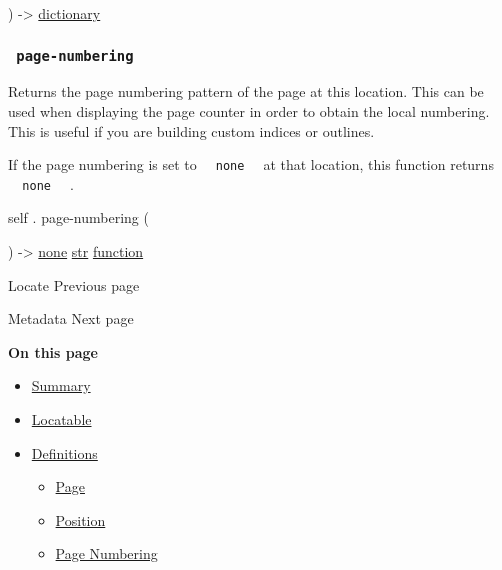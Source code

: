 ) -\textgreater{}
\href{/docs/reference/foundations/dictionary/}{dictionary}

\subsubsection{\texorpdfstring{\texttt{\ page-numbering\ }}{ page-numbering }}\label{definitions-page-numbering}

Returns the page numbering pattern of the page at this location. This
can be used when displaying the page counter in order to obtain the
local numbering. This is useful if you are building custom indices or
outlines.

If the page numbering is set to
\texttt{\ }{\texttt{\ none\ }}\texttt{\ } at that location, this
function returns \texttt{\ }{\texttt{\ none\ }}\texttt{\ } .

self { . } { page-numbering } (

) -\textgreater{} \href{/docs/reference/foundations/none/}{none}
\href{/docs/reference/foundations/str/}{str}
\href{/docs/reference/foundations/function/}{function}

\href{/docs/reference/introspection/locate/}{\pandocbounded{}}

{ Locate } { Previous page }

\href{/docs/reference/introspection/metadata/}{\pandocbounded{}}

{ Metadata } { Next page }

\textbf{On this page}

\begin{itemize}
\tightlist
\item
  \hyperref[summary]{Summary}
\item
  \hyperref[locatable]{Locatable}
\item
  \hyperref[definitions]{Definitions}

  \begin{itemize}
  \tightlist
  \item
    \hyperref[definitions-page]{Page}
  \item
    \hyperref[definitions-position]{Position}
  \item
    \hyperref[definitions-page-numbering]{Page Numbering}
  \end{itemize}
\end{itemize}

